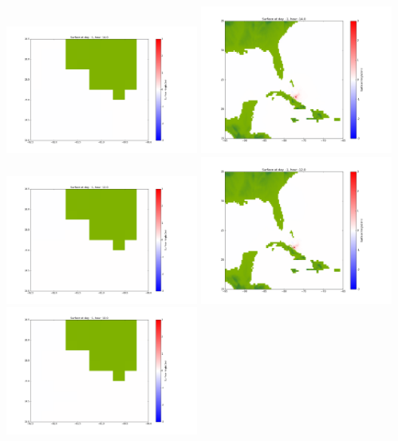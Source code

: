 \documentclass[11pt]{article}
\begin{document}
\vskip 10pt 
\includegraphics[width=0.475\textwidth]{frame0005fig1001.png}
\includegraphics[width=0.475\textwidth]{frame0005fig1002.png}
\vskip 10pt 
\includegraphics[width=0.475\textwidth]{frame0006fig1001.png}
\includegraphics[width=0.475\textwidth]{frame0006fig1002.png}
\vskip 10pt 
\includegraphics[width=0.475\textwidth]{frame0007fig1001.png}
\end{document}
